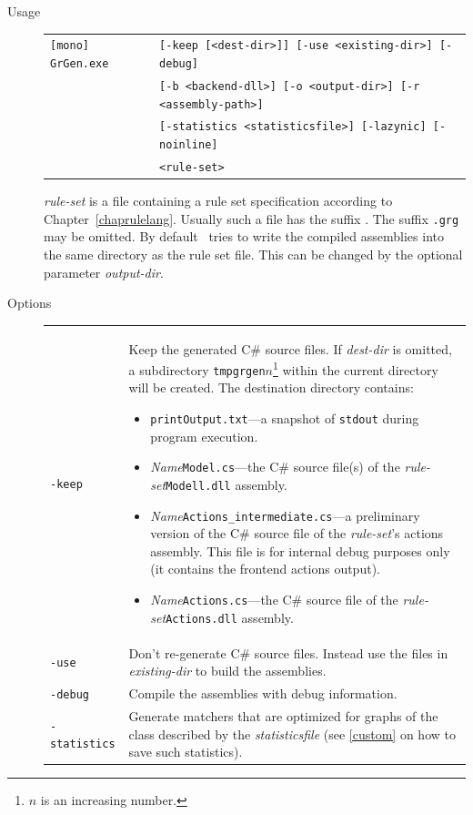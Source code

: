 \begin{description}
  \item[Usage] \begin{tabular*}{\linewidth}{@{}l@{}l}\texttt{[mono] GrGen.exe } & \texttt{[-keep [<dest-dir>]] [-use <existing-dir>] [-debug]}\\
        &\texttt{[-b <backend-dll>] [-o <output-dir>] [-r <assembly-path>]}\\
        &\texttt{[-statistics <statisticsfile>] [-lazynic] [-noinline]}\\
        &\texttt{<rule-set>}\end{tabular*}
    \emph{rule-set} is a file containing a rule set specification according to Chapter~\ref{chaprulelang}. Usually such a file has the suffix \texttt{}. The suffix \texttt{.grg} may be omitted.
By default \GrG\ tries to write the compiled assemblies into the same directory as the rule set file. This can be changed by the optional parameter \emph{output-dir}.
  \item[Options] \mbox{}
    \begin{tabularx}{\linewidth}{lX}
      \texttt{-keep} & Keep the generated C\# source files. If \emph{dest-dir} is omitted, a subdirectory \texttt{tmpgrgen$n$}\footnote{$n$ is an increasing number.} within the current directory will be created. The destination directory contains:
\begin{itemize}
  \item \texttt{printOutput.txt}---a snapshot of \texttt{stdout} during program execution.
  \item \emph{Name}\texttt{Model.cs}---the C\# source file(s) of the \emph{rule-set}\texttt{Modell.dll} assembly.
  \item \emph{Name}\texttt{Actions\_intermediate.cs}---a preliminary version of the C\# source file of the \emph{rule-set}'s actions assembly.
	This file is for internal debug purposes only (it contains the frontend actions output).
  \item \emph{Name}\texttt{Actions.cs}---the C\# source file of the \emph{rule-set}\texttt{Actions.dll} assembly.
\end{itemize}\\
      \texttt{-use} & Don't re-generate C\# source files. Instead use the files in \emph{existing-dir} to build the assemblies.\\
      \texttt{-debug} & Compile the assemblies with debug information.\\
      \texttt{-statistics} & Generate matchers that are optimized for graphs of the class described by the \emph{statisticsfile} (see \ref{custom} on how to save such statistics).\\

\end{tabularx}
\end{description}
